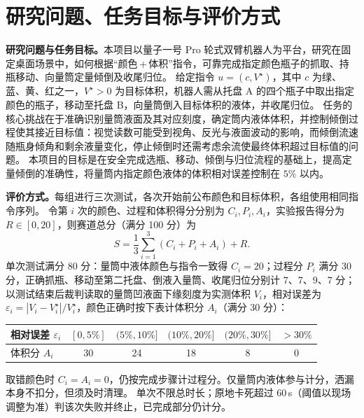 \section{研究问题、任务目标与评价方式}

\textbf{研究问题与任务目标。}本项目以量子一号 Pro 轮式双臂机器人为平台，研究在固定桌面场景中，如何根据“颜色\,+\,体积”指令，可靠完成指定颜色瓶子的抓取、持瓶移动、向量筒定量倾倒及收尾归位。
给定指令 $u=(c,V^\star)$，其中 $c$ 为绿、蓝、黄、红之一，$V^\star>0$ 为目标体积，机器人需从托盘 A 的四个瓶子中取出指定颜色的瓶子，移动至托盘 B，向量筒倒入目标体积的液体，并收尾归位。
任务的核心挑战在于准确识别量筒液面及其对应刻度，确定筒内液体体积，并控制倾倒过程使其接近目标值：视觉读数可能受到视角、反光与液面波动的影响，而倾倒流速随瓶身倾角和剩余液量变化，停止倾倒时还需考虑余流使最终体积超过目标值的问题。
本项目的目标是在安全完成选瓶、移动、倾倒与归位流程的基础上，提高定量倾倒的准确性，将量筒内指定颜色液体的体积相对误差控制在 $5\%$ 以内。

\textbf{评价方式。}每组进行三次测试，各次开始前公布颜色和目标体积，各组使用相同指令序列。
令第 $i$ 次的颜色、过程和体积得分分别为 $C_i,P_i,A_i$，实验报告得分为 $R\in[0,20]$，则赛道总分（满分 100 分）为
\[
  S=\frac{1}{3}\sum_{i=1}^{3}(C_i+P_i+A_i)+R.
\]
单次测试满分 80 分：量筒中液体颜色与指令一致得 $C_i=20$；过程分 $P_i$ 满分 30 分，正确抓瓶、移动至第二托盘、倒液入量筒、收尾归位分别计 7、7、9、7 分；
以测试结束后裁判读取的量筒凹液面下缘刻度为实测体积 $V_i$，相对误差为 $\varepsilon_i=|V_i-V_i^\star|/V_i^\star$，颜色正确时按下表计体积分 $A_i$（满分 30 分）：
\begin{center}
  \small
  \begin{tabular}{@{}lccccc@{}}
    \toprule
    相对误差 $\varepsilon_i$ & $[0,5\%]$ & $(5\%,10\%]$ & $(10\%,20\%]$ & $(20\%,30\%]$ & $>30\%$ \\
    \midrule
    体积分 $A_i$ & 30 & 24 & 18 & 8 & 0 \\
    \bottomrule
  \end{tabular}
\end{center}
取错颜色时 $C_i=A_i=0$，仍按完成步骤计过程分。仅量筒内液体参与计分，洒漏本身不扣分，但须及时清理。
单次不限总时长；原地卡死超过 60\,s（阈值以现场调整为准）判该次失败并终止，已完成部分仍计分。

